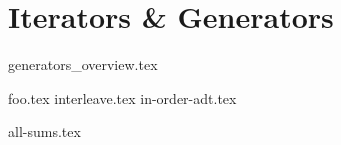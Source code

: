 \documentclass{exam}
\begin{document}
\section{Iterators \& Generators}
{generators_overview.tex}
\begin{questions}
    {foo.tex}
{interleave.tex}
{in-order-adt.tex}

{all-sums.tex}


\end{questions}
\end{document}
